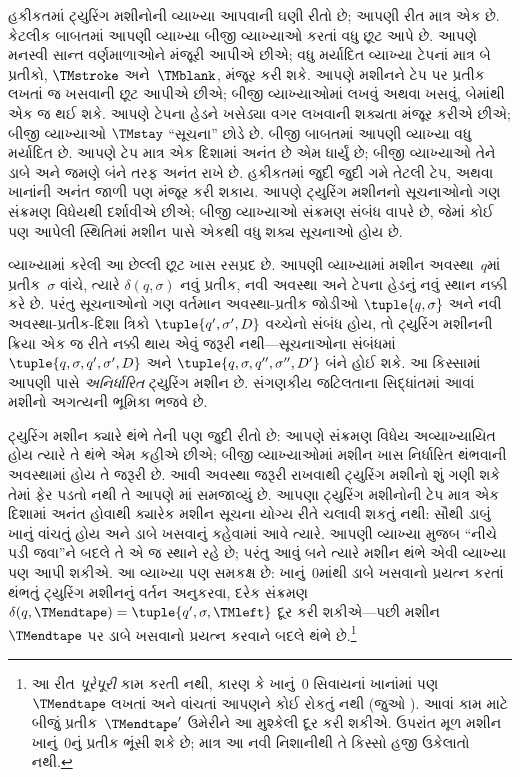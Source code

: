 \documentclass[../../../include/open-logic-section]{subfiles}
\begin{document}

હકીકતમાં ટ્યુરિંગ મશીનોની વ્યાખ્યા આપવાની ઘણી રીતો છે;
આપણી રીત માત્ર એક છે. કેટલીક બાબતમાં આપણી વ્યાખ્યા
બીજી વ્યાખ્યાઓ કરતાં વધુ છૂટ આપે છે. આપણે મનસ્વી
સાન્ત વર્ણમાળાઓને મંજૂરી આપીએ છીએ; વધુ મર્યાદિત
વ્યાખ્યા ટેપનાં માત્ર બે પ્રતીકો, $\TMstroke$ અને~$\TMblank$,
મંજૂર કરી શકે. આપણે મશીનને ટેપ પર પ્રતીક લખતાં જ
ખસવાની છૂટ આપીએ છીએ; બીજી વ્યાખ્યાઓમાં લખવું
અથવા ખસવું, બેમાંથી એક જ થઈ શકે. આપણે ટેપના હેડને
ખસેડ્યા વગર લખવાની શક્યતા મંજૂર કરીએ છીએ; બીજી
વ્યાખ્યાઓ $\TMstay$ ``સૂચના'' છોડે છે. બીજી બાબતમાં
આપણી વ્યાખ્યા વધુ મર્યાદિત છે. આપણે ટેપ માત્ર એક
દિશામાં અનંત છે એમ ધાર્યું છે; બીજી વ્યાખ્યાઓ તેને ડાબે
અને જમણે બંને તરફ અનંત રાખે છે. હકીકતમાં જુદી જુદી
ગમે તેટલી ટેપ, અથવા ખાનાંની અનંત જાળી પણ મંજૂર કરી
શકાય. આપણે ટ્યુરિંગ મશીનનો સૂચનાઓનો ગણ સંક્રમણ
વિધેયથી દર્શાવીએ છીએ; બીજી વ્યાખ્યાઓ સંક્રમણ સંબંધ
વાપરે છે, જેમાં કોઈ પણ આપેલી સ્થિતિમાં મશીન પાસે
એકથી વધુ શક્ય સૂચનાઓ હોય છે.

વ્યાખ્યામાં કરેલી આ છેલ્લી છૂટ ખાસ રસપ્રદ છે. આપણી
વ્યાખ્યામાં મશીન અવસ્થા~$q$માં પ્રતીક~$\sigma$ વાંચે,
ત્યારે $\delta(q, \sigma)$ નવું પ્રતીક, નવી અવસ્થા અને
ટેપના હેડનું નવું સ્થાન નક્કી કરે છે. પરંતુ સૂચનાઓનો
ગણ વર્તમાન અવસ્થા-પ્રતીક જોડીઓ $\tuple{q,
  \sigma}$ અને નવી અવસ્થા-પ્રતીક-દિશા ત્રિકો
$\tuple{q', \sigma',
  D}$ વચ્ચેનો સંબંધ હોય, તો ટ્યુરિંગ મશીનની ક્રિયા
એક જ રીતે નક્કી થાય એવું જરૂરી નથી---સૂચનાઓના
સંબંધમાં $\tuple{q,
  \sigma, q', \sigma', D}$ અને
$\tuple{q, \sigma, q'', \sigma'', D'}$ બંને હોઈ શકે.
આ કિસ્સામાં આપણી પાસે \emph{અનિર્ધારિત} ટ્યુરિંગ મશીન
છે. સંગણકીય જટિલતાના સિદ્ધાંતમાં આવાં મશીનો અગત્યની
ભૂમિકા ભજવે છે.

ટ્યુરિંગ મશીન ક્યારે થંભે તેની પણ જુદી રીતો છે: આપણે
સંક્રમણ વિધેય અવ્યાખ્યાયિત હોય ત્યારે તે થંભે એમ કહીએ
છીએ; બીજી વ્યાખ્યાઓમાં મશીન ખાસ નિર્ધારિત થંભવાની
અવસ્થામાં હોય તે જરૂરી છે. આવી અવસ્થા જરૂરી રાખવાથી
ટ્યુરિંગ મશીનો શું ગણી શકે તેમાં ફેર પડતો નથી તે આપણે
માં સમજાવ્યું છે. આપણા ટ્યુરિંગ મશીનોની
ટેપ માત્ર એક દિશામાં અનંત હોવાથી ક્યારેક મશીન સૂચના
યોગ્ય રીતે ચલાવી શકતું નથી: સૌથી ડાબું ખાનું વાંચતું
હોય અને ડાબે ખસવાનું કહેવામાં આવે ત્યારે. આપણી
વ્યાખ્યા મુજબ ``નીચે પડી જવા''ને બદલે તે એ જ સ્થાને
રહે છે; પરંતુ આવું બને ત્યારે મશીન થંભે એવી વ્યાખ્યા
પણ આપી શકીએ. આ વ્યાખ્યા પણ સમકક્ષ છે: ખાનું~$0$માંથી
ડાબે ખસવાનો પ્રયત્ન કરતાં થંભતું ટ્યુરિંગ મશીનનું વર્તન
અનુકરવા, દરેક સંક્રમણ $\delta(q,\TMendtape) =
\tuple{q',\sigma,\TMleft}$ દૂર કરી શકીએ---પછી
મશીન~$\TMendtape$ પર ડાબે ખસવાનો પ્રયત્ન કરવાને
બદલે થંભે છે.\footnote{આ રીત \emph{પૂરેપૂરી} કામ
કરતી નથી, કારણ કે ખાનું~$0$ સિવાયનાં ખાનાંમાં પણ
$\TMendtape$ લખતાં અને વાંચતાં આપણને કોઈ રોકતું નથી
(જુઓ ). આવાં કામ માટે બીજું
પ્રતીક~$\TMendtape'$ ઉમેરીને આ મુશ્કેલી દૂર કરી શકીએ.
ઉપરાંત મૂળ મશીન ખાનું~$0$નું પ્રતીક ભૂંસી શકે છે; માત્ર
આ નવી નિશાનીથી તે કિસ્સો હજી ઉકેલાતો નથી.}
\end{document}
